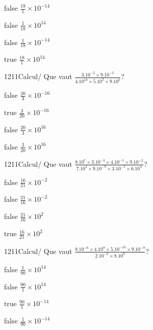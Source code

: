             \begin{reponses}
                \item[false] $\frac{18}{1}\times 10^{-14}$
                \item[false] $\frac{1}{18}\times 10^{14}$
                \item[false] $\frac{1}{18}\times 10^{-14}$
                \item[true] $\frac{18}{1}\times 10^{14}$
            \end{reponses}
            \begin{question}{1211}{Calcul}{}{/}
                Que vaut $\frac{3.10^{-2}\times 9.10^{-2}}{4.10^{10}\times 5.10^{2}\times 9.10^{0}}$?
            \end{question}
            \begin{reponses}
                \item[false] $\frac{20}{3}\times 10^{-16}$
                \item[true] $\frac{3}{20}\times 10^{-16}$
                \item[false] $\frac{20}{3}\times 10^{16}$
                \item[false] $\frac{3}{20}\times 10^{16}$
            \end{reponses}
            \begin{question}{1211}{Calcul}{}{/}
                Que vaut $\frac{8.10^{7}\times 3.10^{-3}\times 4.10^{-5}\times 9.10^{-2}}{7.10^{4}\times 9.10^{-8}\times 3.10^{-5}\times 6.10^{4}}$?
            \end{question}
            \begin{reponses}
                \item[false] $\frac{16}{21}\times 10^{-2}$
                \item[false] $\frac{21}{16}\times 10^{-2}$
                \item[false] $\frac{21}{16}\times 10^{2}$
                \item[true] $\frac{16}{21}\times 10^{2}$
            \end{reponses}
            \begin{question}{1211}{Calcul}{}{/}
                Que vaut $\frac{8.10^{-6}\times 4.10^{9}\times 5.10^{-10}\times 9.10^{-9}}{2.10^{-2}\times 8.10^{0}}$?
            \end{question}
            \begin{reponses}
                \item[false] $\frac{1}{90}\times 10^{14}$
                \item[false] $\frac{90}{1}\times 10^{14}$
                \item[true] $\frac{90}{1}\times 10^{-14}$
                \item[false] $\frac{1}{90}\times 10^{-14}$
            \end{reponses}
